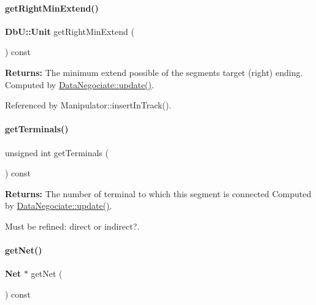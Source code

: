 \paragraph{\texorpdfstring{get\+Right\+Min\+Extend()}{getRightMinExtend()}}
{\footnotesize\ttfamily \textbf{ Db\+U\+::\+Unit} get\+Right\+Min\+Extend (\begin{DoxyParamCaption}{ }\end{DoxyParamCaption}) const\hspace{0.3cm}{\ttfamily [inline]}}

{\bfseries Returns\+:} The minimum extend possible of the segment\textquotesingle{}s target (right) ending. Computed by \hyperlink{classKite_1_1DataNegociate_ac5c54df7ed3b930268c8d7752c101725}{Data\+Negociate\+::update()}. 

Referenced by Manipulator\+::insert\+In\+Track().

\mbox{\label{classKite_1_1DataNegociate_a4f6fbcee2499d33394ab54f856c500c0}} 
\paragraph{\texorpdfstring{get\+Terminals()}{getTerminals()}}
{\footnotesize\ttfamily unsigned int get\+Terminals (\begin{DoxyParamCaption}{ }\end{DoxyParamCaption}) const\hspace{0.3cm}{\ttfamily [inline]}}

{\bfseries Returns\+:} The number of terminal to which this segment is connected Computed by \hyperlink{classKite_1_1DataNegociate_ac5c54df7ed3b930268c8d7752c101725}{Data\+Negociate\+::update()}.

Must be refined\+: direct or indirect?. \mbox{\label{classKite_1_1DataNegociate_a692492374623a5c6096b2c4a51190359}} 
\paragraph{\texorpdfstring{get\+Net()}{getNet()}}
{\footnotesize\ttfamily \textbf{ Net} $\ast$ get\+Net (\begin{DoxyParamCaption}{ }\end{DoxyParamCaption}) const\hspace{0.3cm}{\ttfamily [inline]}}

